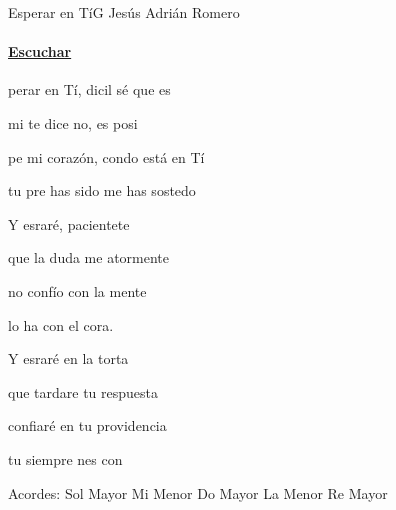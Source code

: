 \documentclass[12pt, spanish]{book}
\begin{document}
    \begin{song}{Esperar en Tí}{G}
    {} %
    {Jesús Adrián Romero}
    {} %
    {}
        \ifChordBk
        \paragraph{\mbox{}\hfill\protect\href{https://open.spotify.com/intl-es/track/3YkViDWlrUcCIafb1nXxjQ}{Escuchar}\mbox{}\hfill}
        \fi

        \begin{SBOpGroup}
            perar en Tí, dicil sé que es

            mi te dice no,  es posi

            pe mi corazón, condo está en Tí

            tu pre has sido  me has sostedo
        \end{SBOpGroup}
        \vskip 20pt
        \begin{SBOpGroup}
            Y esraré, pacientete

            que la duda me atormente

             no confío con la mente

            lo ha con el cora.
        \end{SBOpGroup}

        \begin{SBChorus}
            Y esraré en la torta

            que tardare tu respuesta

             confiaré en tu providencia

            tu siempre nes  con
        \end{SBChorus}

        \ifChordBk
        \begin{SBOpGroup}
            Acordes:\break
            \upchord{\G}\qquad Sol Mayor \hfill
            \upchord{\Em}\qquad Mi Menor \hfill\null\break
            \upchord{\C}\qquad Do Mayor \hfill
            \upchord{\Am}\qquad La Menor \hfill
            \upchord{\D}\qquad Re Mayor \hfill\null\break
        \end{SBOpGroup}
        \fi
    \end{song}
\end{document}
